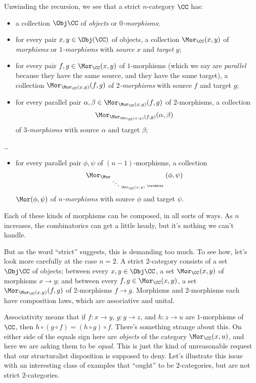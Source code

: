 Unwinding the recursion, we see that a strict $n$-category $\CC$ has:
\begin{itemize}
  \item a collection $\Obj \CC$ of \emph{objects} or \emph{$0$-morphisms};
  \item for every pair $x,y \in \Obj(\CC)$ of objects, a collection $\Mor_{\CC}(x,y)$ of \emph{morphisms} or \emph{$1$-morphisms} with \emph{source} $x$ and \emph{target} $y$;
  \item for every pair $f,g \in \Mor_{\CC}(x,y)$ of $1$-morphisms (which we say are \emph{parallel} because they have the same source, and they have the same target), a collection $\Mor_{\Mor_{\CC}(x,y)}(f,g)$ of \emph{$2$-morphisms} with source $f$ and target $g$;
  \item for every parallel pair $\alpha,\beta \in \Mor_{\Mor_{\CC}(x,y)}(f,g)$ of $2$-morphisms, a collection
    \[
      \Mor_{\Mor_{\Mor_{\CC}(x,y)}(f,g)}(\alpha,\beta)
    \]
    of \emph{$3$-morphisms} with source $\alpha$ and target $\beta$;
\end{itemize}

\dots

\begin{itemize}
  \item for every parallel pair $\phi, \psi$ of $(n-1)$-morphisms, a collection
    \[
    \Mor_{\Mor_{\;{\ddots}_{\;\Mor_{\CC}(x,y)\;}{\revddots}\;}}(\phi,\psi)
    \]
    $\Mor(\phi,\psi)$ of \emph{$n$-morphisms} with source $\phi$ and target $\psi$.
\end{itemize} 
Each of these kinds of morphisms can be composed, in all sorts of ways.
As $n$ increases, the combinatorics can get a little heady, but it's nothing we can't handle.

But as the word \enquote{strict} suggests, this is demanding too much.
To see how, let's look more carefully at the case $n = 2$.
A strict $2$-category consists of a set $\Obj \CC$ of objects;
between every $x,y \in \Obj \CC$, a set $\Mor_{\CC}(x,y)$ of morphisms $x \to y$; and
between every $f,g \in \Mor_{\CC}(x,y)$, a set $\Mor_{\Mor_{\CC}(x,y)}(f,g)$ of $2$-morphisms $f \to g$.
Morphisms and $2$-morphisms each have composition laws, which are associative and unital.

Associativity means that if $f \colon x \to y$, $g \colon y \to z$, and $h \colon z \to u$ are $1$-morphisms of $\CC$, then $h \circ (g \circ f) = (h \circ g) \circ f$.
There's something strange about this.
On either side of the equals sign here are \emph{objects} of the category $\Mor_{\CC}(x,u)$, and here we are asking them to be \emph{equal}.
This is just the kind of unreasonable request that our structuralist disposition is supposed to deny.
Let's illustrate this issue with an interesting class of examples that \enquote{ought} to be $2$-categories, but are not strict $2$-categories.

